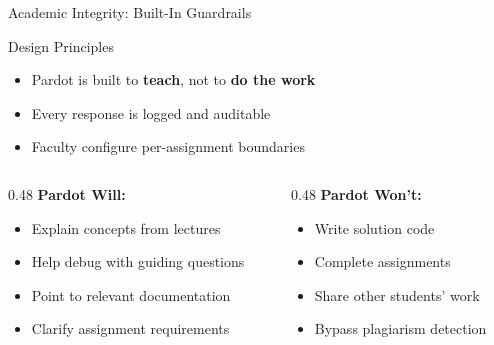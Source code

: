 \documentclass[aspectratio=169]{beamer}
\begin{document}
\begin{frame}{Academic Integrity: Built-In Guardrails}
\begin{block}{Design Principles}
\begin{itemize}
  \item Pardot is built to \textbf{teach}, not to \textbf{do the work}
  \item Every response is logged and auditable
  \item Faculty configure per-assignment boundaries
\end{itemize}
\end{block}
\vspace{0.5em}
\begin{columns}[T]
\begin{column}{0.48\textwidth}
\textbf{Pardot Will:}
\begin{itemize}
  \item Explain concepts from lectures
  \item Help debug with guiding questions
  \item Point to relevant documentation
  \item Clarify assignment requirements
\end{itemize}
\end{column}
\begin{column}{0.48\textwidth}
\textbf{Pardot Won't:}
\begin{itemize}
  \item Write solution code
  \item Complete assignments
  \item Share other students' work
  \item Bypass plagiarism detection
\end{itemize}
\end{column}
\end{columns}
\end{frame}
\end{document}
